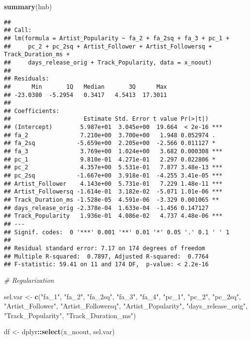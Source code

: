 \documentclass[
]{article}
\newenvironment{Shaded}{\begin{snugshade}}{\end{snugshade}}
\newcommand{\CommentTok}[1]{\textcolor[rgb]{0.56,0.35,0.01}{\textit{#1}}}
\newcommand{\KeywordTok}[1]{\textcolor[rgb]{0.13,0.29,0.53}{\textbf{#1}}}
\newcommand{\NormalTok}[1]{#1}
\newcommand{\OperatorTok}[1]{\textcolor[rgb]{0.81,0.36,0.00}{\textbf{#1}}}
\newcommand{\StringTok}[1]{\textcolor[rgb]{0.31,0.60,0.02}{#1}}
\begin{document}
\begin{Shaded}
\begin{Highlighting}[]
\KeywordTok{summary}\NormalTok{(lmb)}
\end{Highlighting}
\end{Shaded}

\begin{verbatim}
## 
## Call:
## lm(formula = Artist_Popularity ~ fa_2 + fa_2sq + fa_3 + pc_1 + 
##     pc_2 + pc_2sq + Artist_Follower + Artist_Followersq + Track_Duration_ms + 
##     days_release_orig + Track_Popularity, data = x_noout)
## 
## Residuals:
##      Min       1Q   Median       3Q      Max 
## -23.0380  -5.2954   0.3417   4.5413  17.3011 
## 
## Coefficients:
##                     Estimate Std. Error t value Pr(>|t|)    
## (Intercept)        5.987e+01  3.045e+00  19.664  < 2e-16 ***
## fa_2               7.210e+00  3.700e+00   1.948 0.052974 .  
## fa_2sq            -5.659e+00  2.205e+00  -2.566 0.011127 *  
## fa_3               3.769e+00  1.024e+00   3.682 0.000308 ***
## pc_1               9.810e-01  4.271e-01   2.297 0.022806 *  
## pc_2               4.357e+00  5.531e-01   7.877 3.48e-13 ***
## pc_2sq            -1.667e+00  3.918e-01  -4.255 3.41e-05 ***
## Artist_Follower    4.143e+00  5.731e-01   7.229 1.48e-11 ***
## Artist_Followersq -1.614e-01  3.182e-02  -5.071 1.01e-06 ***
## Track_Duration_ms -1.528e-05  4.591e-06  -3.329 0.001065 ** 
## days_release_orig -2.378e-04  1.633e-04  -1.456 0.147127    
## Track_Popularity   1.936e-01  4.086e-02   4.737 4.48e-06 ***
## ---
## Signif. codes:  0 '***' 0.001 '**' 0.01 '*' 0.05 '.' 0.1 ' ' 1
## 
## Residual standard error: 7.17 on 174 degrees of freedom
## Multiple R-squared:  0.7897, Adjusted R-squared:  0.7764 
## F-statistic: 59.41 on 11 and 174 DF,  p-value: < 2.2e-16
\end{verbatim}

\begin{Shaded}
\begin{Highlighting}[]
\CommentTok{# Regularization}

\NormalTok{sel.var <-}\StringTok{ }\KeywordTok{c}\NormalTok{(}\StringTok{"fa_1"}\NormalTok{, }\StringTok{"fa_2"}\NormalTok{, }\StringTok{"fa_2sq"}\NormalTok{, }\StringTok{"fa_3"}\NormalTok{, }\StringTok{"fa_4"}\NormalTok{, }\StringTok{"pc_1"}\NormalTok{, }\StringTok{"pc_2"}\NormalTok{, }\StringTok{"pc_2sq"}\NormalTok{, }\StringTok{"Artist_Follower"}\NormalTok{, }\StringTok{"Artist_Followersq"}\NormalTok{, }\StringTok{"Artist_Popularity"}\NormalTok{, }\StringTok{"days_release_orig"}\NormalTok{, }\StringTok{"Track_Popularity"}\NormalTok{, }\StringTok{"Track_Duration_ms"}\NormalTok{) }

\NormalTok{df <-}\StringTok{ }\NormalTok{dplyr}\OperatorTok{::}\KeywordTok{select}\NormalTok{(x_noout, sel.var)}
\end{Highlighting}
\end{Shaded}
\end{document}
